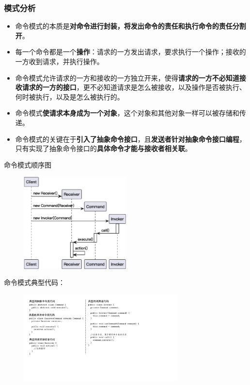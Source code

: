 \subsubsection{模式分析}
\begin{itemize}
    \item 命令模式的本质是\textbf{对命令进行封装，将发出命令的责任和执行命令的责任分割开}。
    \item 每一个命令都是一个\textbf{操作}：请求的一方发出请求，要求执行一个操作；接收的一方收到请求，并执行操作。
    \item 命令模式允许请求的一方和接收的一方独立开来，使得\textbf{请求的一方不必知道接收请求的一方的接口}，更不必知道请求是怎么被接收，以及操作是否被执行、何时被执行，以及是怎么被执行的。
    \item 命令模式\textbf{使请求本身成为一个对象}，这个对象和其他对象一样可以被存储和传递。
    \item 命令模式的关键在于\textbf{引入了抽象命令接口}，且\textbf{发送者针对抽象命令接口编程}，只有实现了抽象命令接口的\textbf{具体命令才能与接收者相关联}。
\end{itemize}

命令模式顺序图
\begin{figure}[H]
    \vspace{-0.5em}
	\centering
	\includegraphics[width=0.5\textwidth]{images/命令模式顺序图.eps}
    \vspace{-1em}
\end{figure}

命令模式典型代码：
\begin{figure}[H]
    \vspace{-0.5em}
	\centering
	\includegraphics[width=0.75\textwidth]{images/命令模式典型代码.pdf}
    \vspace{-1em}
\end{figure}


